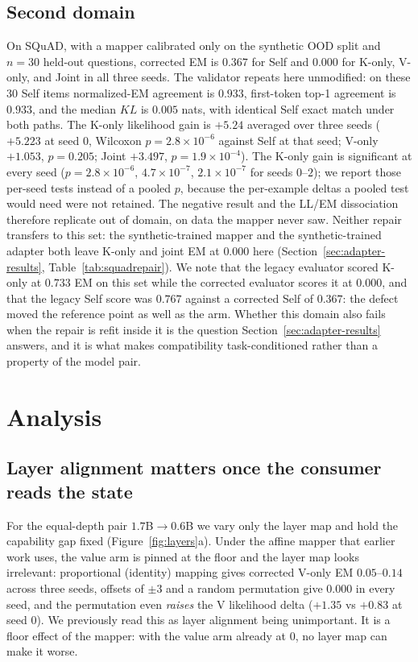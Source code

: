\documentclass[11pt]{article}
\begin{document}
\subsection{Second domain}
\label{sec:second-domain}
On SQuAD, with a mapper calibrated only on the synthetic OOD split and $n=30$
held-out questions, corrected EM is $0.367$ for Self and $0.000$ for K-only,
V-only, and Joint in all three seeds. The validator repeats here unmodified: on
these $30$ Self items normalized-EM agreement is $0.933$, first-token top-1
agreement is $0.933$, and the median $KL$ is $0.005$ nats, with identical Self
exact match under both paths. The K-only likelihood gain is $+5.24$
averaged over three seeds ($+5.223$ at seed 0, Wilcoxon $p = 2.8\times10^{-6}$
against Self at that seed; V-only $+1.053$, $p=0.205$; Joint $+3.497$,
$p=1.9\times10^{-4}$). The K-only gain is significant at every seed
($p = 2.8\times10^{-6}$, $4.7\times10^{-7}$, $2.1\times10^{-7}$ for seeds
$0$--$2$); we report those per-seed tests instead of a pooled $p$, because the
per-example deltas a pooled test would need were not retained. The negative
result and the LL/EM dissociation therefore replicate out of domain, on data the
mapper never saw. Neither repair transfers to this set: the synthetic-trained
mapper and the synthetic-trained adapter both leave K-only and joint EM at
$0.000$ here (Section~\ref{sec:adapter-results},
Table~\ref{tab:squadrepair}). We note that the
legacy evaluator scored K-only at $0.733$ EM on this set while the corrected
evaluator scores it at $0.000$, and that the legacy Self score was $0.767$
against a corrected Self of $0.367$: the defect moved the reference point as well
as the arm. Whether this domain also fails when the repair is refit inside it is
the question Section~\ref{sec:adapter-results} answers, and it is what makes
compatibility task-conditioned rather than a property of the model pair.
\section{Analysis}

\subsection{Layer alignment matters once the consumer reads the state}
\label{sec:layer-align}
For the equal-depth pair $1.7$B$\to0.6$B we vary only the layer map and hold the
capability gap fixed (Figure~\ref{fig:layers}a). Under the affine mapper that
earlier work uses, the value arm is pinned at the floor and the layer map looks
irrelevant: proportional (identity) mapping gives corrected V-only EM
$0.05$--$0.14$ across three seeds, offsets of $\pm3$ and a random permutation
give $0.000$ in every seed, and the permutation even \emph{raises} the V
likelihood delta ($+1.35$ vs $+0.83$ at seed 0). We previously read this as layer
alignment being unimportant. It is a floor effect of the mapper: with the value
arm already at $0$, no layer map can make it worse.
\end{document}
